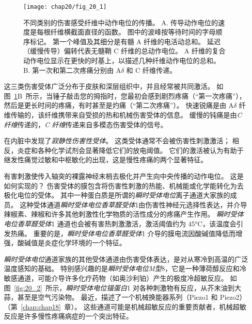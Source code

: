 \begin{figure}[htbp]
	\centering
	\texttt{[image: chap20/fig\_20\_1]}
	\caption{不同类别的伤害感受纤维中动作电位的传播。 
		A. 传导动作电位的速度是每根纤维横截面直径的函数。
		图中的波峰按等待时间的字母顺序标记。
		第一个峰值及其细分是有髓 A 纤维的电活动总和。
		延迟（缓慢传导）偏转代表无髓鞘 C 纤维的总动作电位。
		A 纤维的复合动作电位显示在更快的时基上，以描述几种纤维动作电位的总和\cite{perl2007ideas}。
		B. 第一次和第二次疼痛分别由 A$\delta$ 和 C 纤维传递\cite{fields1987painful}。}
	\label{fig:20_1}
\end{figure}


这三类伤害受体广泛分布于皮肤和深层组织中，并且经常被共同激活。
如图~\ref{fig:20_1}B~所示，当锤子敲击您的拇指时，您最初会感到剧烈疼痛（“第一次疼痛”），然后是更长时间的疼痛，有时甚至是灼痛（“第二次疼痛”）。
快速锐痛是由 A$ \delta $ 纤维传输的，该纤维携带来自受损的热和机械伤害受体的信息。
缓慢的钝痛是由\textit{C 纤维}传递的，\textit{C 纤维}传递来自多模态伤害受体的信号。


在内脏中发现了\textit{寂静性伤害性受体}。
这类受体通常不会被伤害性刺激激活；
相反，炎症和各种化学试剂会显著降低它们的放电阈值。
它们的激活被认为有助于继发性痛觉过敏和中枢敏化的出现，这是慢性疼痛的两个显著特征。


有害刺激使传入轴突的裸露神经末梢去极化并产生向中央传播的动作电位。
这是如何实现的？
伤害受体的膜包含将伤害性刺激的热能、机械能或化学能转化为去极化电位的受体。
其中一种蛋白质是所谓的\textit{瞬时受体电位}离子通道大家族的成员。
这种受体通道\textit{瞬时受体电位香草醛受体}1由伤害性神经元选择性表达，并介导辣椒素、辣椒和许多其他刺激性化学物质的活性成分的疼痛产生作用。
\textit{瞬时受体电位香草醛受体}1 通道也会被有害热刺激激活，激活阈值约为 45°C，该温度会引发热痛。
重要的是，\textit{瞬时受体电位香草醛受体}1 介导的膜电流因酸碱值降低而增强，酸碱值是炎症化学环境的一个特征。


\textit{瞬时受体电位}通道家族的其他受体通道由伤害受体表达，是对从寒冷到高温的广泛温度感知的基础。
特别感兴趣的是\textit{瞬时受体电位M型}8，它是一种薄荷醇反应和冷敏感通道，可能介导许多化疗药物（如奥沙利铂）产生的极度冷超敏反应。
如图~\ref{fig:20_2}~所示，\textit{瞬时受体电位锚蛋白}1 对各种刺激物有反应，从芥末油到大蒜，甚至是空气污染物。
最近，描述了一个机械换能器系列（Piezo1 和 Piezo2）（第~\ref{chap:chap18}~章）。
这些通道可能是机械超敏反应的重要贡献者，机械超敏反应是许多慢性疼痛病症的一个突出特征。


